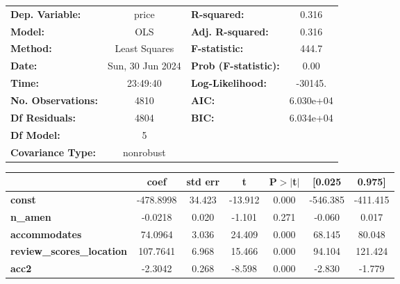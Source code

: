 \begin{center}
\begin{tabular}{lclc}
\toprule
\textbf{Dep. Variable:}           &      price       & \textbf{  R-squared:         } &     0.316   \\
\textbf{Model:}                   &       OLS        & \textbf{  Adj. R-squared:    } &     0.316   \\
\textbf{Method:}                  &  Least Squares   & \textbf{  F-statistic:       } &     444.7   \\
\textbf{Date:}                    & Sun, 30 Jun 2024 & \textbf{  Prob (F-statistic):} &     0.00    \\
\textbf{Time:}                    &     23:49:40     & \textbf{  Log-Likelihood:    } &   -30145.   \\
\textbf{No. Observations:}        &        4810      & \textbf{  AIC:               } & 6.030e+04   \\
\textbf{Df Residuals:}            &        4804      & \textbf{  BIC:               } & 6.034e+04   \\
\textbf{Df Model:}                &           5      & \textbf{                     } &             \\
\textbf{Covariance Type:}         &    nonrobust     & \textbf{                     } &             \\
\bottomrule
\end{tabular}
\begin{tabular}{lcccccc}
                                  & \textbf{coef} & \textbf{std err} & \textbf{t} & \textbf{P$> |$t$|$} & \textbf{[0.025} & \textbf{0.975]}  \\
\midrule
\textbf{const}                    &    -478.8998  &       34.423     &   -13.912  &         0.000        &     -546.385    &     -411.415     \\
\textbf{n\_amen}                  &      -0.0218  &        0.020     &    -1.101  &         0.271        &       -0.060    &        0.017     \\
\textbf{accommodates}             &      74.0964  &        3.036     &    24.409  &         0.000        &       68.145    &       80.048     \\
\textbf{review\_scores\_location} &     107.7641  &        6.968     &    15.466  &         0.000        &       94.104    &      121.424     \\
\textbf{acc2}                     &      -2.3042  &        0.268     &    -8.598  &         0.000        &       -2.830    &       -1.779     \\

\end{tabular}
\end{center}
